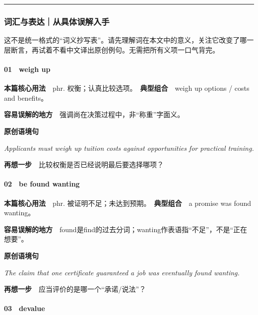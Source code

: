 \documentclass[
  11pt,
]{ctexart}
\renewenvironment{quote}{\begin{tcolorbox}[enhanced,breakable,colback=sand,colframe=primary!22,boxrule=0.4pt,arc=2pt,left=2.6mm,right=2.6mm,top=1.6mm,bottom=1.6mm]\itshape}{\end{tcolorbox}}
\begin{document}
\rule{0.75\linewidth}{0.35pt}

\subsubsection{词汇与表达｜从具体误解入手}\label{ux8bcdux6c47ux4e0eux8868ux8fbeux4eceux5177ux4f53ux8befux89e3ux5165ux624b}

这不是统一格式的``词义抄写表''。请先理解词在本文中的意义，关注它改变了哪一层断言，再试着不看中文译出原创例句。无需把所有义项一口气背完。

\paragraph{01　weigh up}\label{weigh-up}

\textbf{本篇核心用法}　phr.
权衡；认真比较选项。　\textbf{典型组合}　weigh up options / costs and
benefits。

\textbf{容易误解的地方}　强调尚在决策过程中，非``称重''字面义。

\textbf{原创语境句}

\begin{quote}
Applicants must weigh up tuition costs against opportunities for
practical training.
\end{quote}

\textbf{再想一步}　比较权衡是否已经说明最后要选择哪项？

\paragraph{02　be found wanting}\label{be-found-wanting}

\textbf{本篇核心用法}　phr.
被证明不足；未达到预期。　\textbf{典型组合}　a promise was found
wanting。

\textbf{容易误解的地方}　found是find的过去分词；wanting作表语指``不足''，不是``正在想要''。

\textbf{原创语境句}

\begin{quote}
The claim that one certificate guaranteed a job was eventually found
wanting.
\end{quote}

\textbf{再想一步}　应当评价的是哪一个``承诺/说法''？

\paragraph{03　devalue}\label{devalue}
\end{document}
